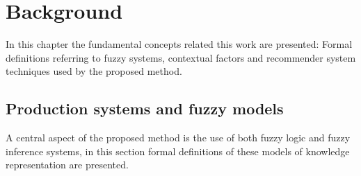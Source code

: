 \chapter{Background}\label{background}

In this chapter the fundamental concepts related this work are presented:
Formal definitions referring to fuzzy systems, contextual factors and
recommender system techniques used by the proposed method.

\section{Production systems and fuzzy models}

A central aspect of the proposed method is the use of both fuzzy logic and
fuzzy inference systems, in this section formal definitions of
these models of knowledge representation are presented.  

